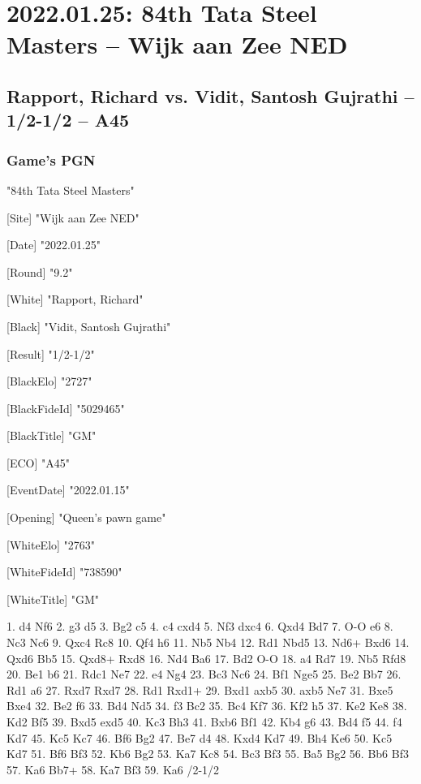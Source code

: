 \documentclass[9pt]{extarticle}
\begin{document}
\section*{2022.01.25: 84th Tata Steel Masters -- Wijk aan Zee NED}

\subsection*{Rapport, Richard vs. Vidit, Santosh Gujrathi -- 1/2-1/2 -- A45}
\subsubsection*{Game's PGN}
\begin{flushleft}
[Event] "84th Tata Steel Masters"

[Site] "Wijk aan Zee NED"

[Date] "2022.01.25"

[Round] "9.2"

[White] "Rapport, Richard"

[Black] "Vidit, Santosh Gujrathi"

[Result] "1/2-1/2"

[BlackElo] "2727"

[BlackFideId] "5029465"

[BlackTitle] "GM"

[ECO] "A45"

[EventDate] "2022.01.15"

[Opening] "Queen's pawn game"

[WhiteElo] "2763"

[WhiteFideId] "738590"

[WhiteTitle] "GM"

\end{flushleft}
\begin{flushleft}
1. d4 Nf6 2. g3 d5 3. Bg2 c5 4. c4 cxd4 5. Nf3 dxc4 6. Qxd4 Bd7 7. O-O e6 8. Nc3 Nc6 9. Qxc4 Rc8 10. Qf4 h6 11. Nb5 Nb4 12. Rd1 Nbd5 13. Nd6+ Bxd6 14. Qxd6 Bb5 15. Qxd8+ Rxd8 16. Nd4 Ba6 17. Bd2 O-O 18. a4 Rd7 19. Nb5 Rfd8 20. Be1 b6 21. Rdc1 Ne7 22. e4 Ng4 23. Bc3 Nc6 24. Bf1 Nge5 25. Be2 Bb7 26. Rd1 a6 27. Rxd7 Rxd7 28. Rd1 Rxd1+ 29. Bxd1 axb5 30. axb5 Ne7 31. Bxe5 Bxe4 32. Be2 f6 33. Bd4 Nd5 34. f3 Bc2 35. Bc4 Kf7 36. Kf2 h5 37. Ke2 Ke8 38. Kd2 Bf5 39. Bxd5 exd5 40. Kc3 Bh3 41. Bxb6 Bf1 42. Kb4 g6 43. Bd4 f5 44. f4 Kd7 45. Kc5 Kc7 46. Bf6 Bg2 47. Be7 d4 48. Kxd4 Kd7 49. Bh4 Ke6 50. Kc5 Kd7 51. Bf6 Bf3 52. Kb6 Bg2 53. Ka7 Kc8 54. Bc3 Bf3 55. Ba5 Bg2 56. Bb6 Bf3 57. Ka6 Bb7+ 58. Ka7 Bf3 59. Ka6 \quad  {}/2-1/2
\end{flushleft}
\end{document}

